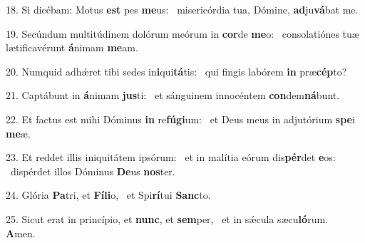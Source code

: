 18. Si dicébam: Motus \textbf{est} pes \textbf{me}us: \ast\  misericórdia tua, Dómine, \textbf{ad}ju\textbf{vá}bat me.\

19. Secúndum multitúdinem dolórum meórum in \textbf{cor}de \textbf{me}o: \ast\  consolatiónes tuæ lætificavérunt \textbf{á}nimam \textbf{me}am.\

20. Numquid adhǽret tibi sedes in\textbf{i}qui\textbf{tá}tis: \ast\  qui fingis labórem \textbf{in} præ\textbf{cép}to?\

21. Captábunt in \textbf{á}nimam \textbf{jus}ti: \ast\  et sánguinem innocéntem \textbf{con}dem\textbf{ná}bunt.\

22. Et factus est mihi Dóminus \textbf{in} re\textbf{fú}\textbf{gi}um: \ast\  et Deus meus in adjutórium \textbf{spe}i \textbf{me}æ.\

23. Et reddet illis iniquitátem ipsórum: \dag\  et in malítia eórum dis\textbf{pér}det \textbf{e}os: \ast\  dispérdet illos Dóminus \textbf{De}us \textbf{nos}ter.\

24. Glória \textbf{Pa}tri, et \textbf{Fí}\textbf{li}o, \ast\  et Spi\textbf{rí}tui \textbf{Sanc}to.\

25. Sicut erat in princípio, et \textbf{nunc}, et \textbf{sem}per, \ast\  et in sǽcula sæcu\textbf{ló}rum. \textbf{A}men.\

